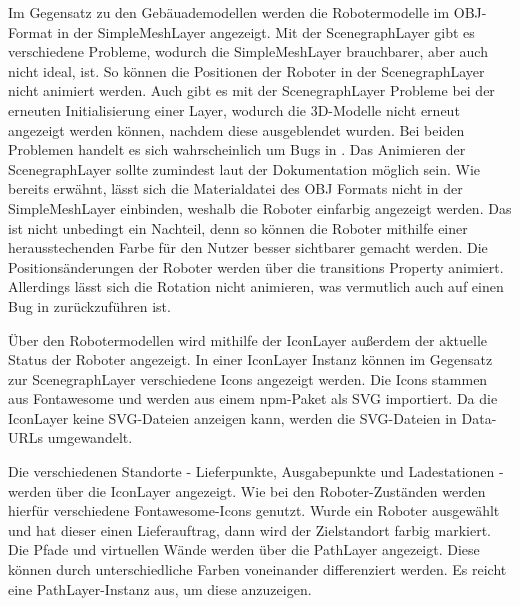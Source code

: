 Im Gegensatz zu den Gebäuademodellen werden die Robotermodelle im \ac{OBJ}-Format in der SimpleMeshLayer angezeigt. Mit der ScenegraphLayer gibt es verschiedene Probleme, wodurch die SimpleMeshLayer brauchbarer, aber auch nicht ideal, ist. So können die Positionen der Roboter in der ScenegraphLayer nicht animiert werden. Auch gibt es mit der ScenegraphLayer Probleme bei der erneuten Initialisierung einer Layer, wodurch die 3D-Modelle nicht erneut angezeigt werden können, nachdem diese ausgeblendet wurden. Bei beiden Problemen handelt es sich wahrscheinlich um Bugs in \deckgl{}. Das Animieren der ScenegraphLayer sollte zumindest laut der Dokumentation möglich sein. 
Wie bereits erwähnt, lässt sich die Materialdatei des \ac{OBJ} Formats nicht in der SimpleMeshLayer einbinden, weshalb die Roboter einfarbig angezeigt werden. Das ist nicht unbedingt ein Nachteil, denn so können die Roboter mithilfe einer herausstechenden Farbe für den Nutzer besser sichtbarer gemacht werden. Die Positionsänderungen der Roboter werden über die transitions Property animiert. Allerdings lässt sich die Rotation nicht animieren, was vermutlich auch auf einen Bug in \deckgl{} zurückzuführen ist.

Über den Robotermodellen wird mithilfe der IconLayer außerdem der aktuelle Status der Roboter angezeigt. In einer IconLayer Instanz können im Gegensatz zur ScenegraphLayer verschiedene Icons angezeigt werden. 
Die Icons stammen aus Fontawesome und werden aus einem \ac{npm}-Paket als \ac{SVG} importiert. Da die IconLayer keine \ac{SVG}-Dateien anzeigen kann, werden die SVG-Dateien in Data-URLs umgewandelt.

Die verschiedenen Standorte - Lieferpunkte, Ausgabepunkte und Ladestationen - werden über die IconLayer angezeigt. Wie bei den Roboter-Zuständen werden hierfür verschiedene Fontawesome-Icons genutzt. Wurde ein Roboter ausgewählt und hat dieser einen Lieferauftrag, dann wird der Zielstandort farbig markiert. Die Pfade und virtuellen Wände werden über die PathLayer angezeigt. Diese können durch unterschiedliche Farben voneinander differenziert werden. 
Es reicht eine PathLayer-Instanz aus, um diese anzuzeigen.

